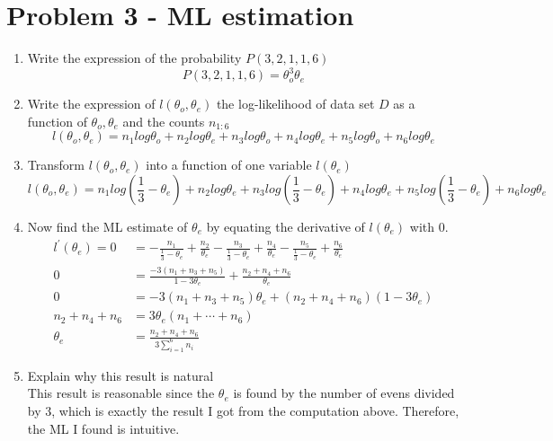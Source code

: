 \documentclass[preprint,12pt]{elsarticle}
\begin{document}
    \section{Problem 3 - ML estimation}
    \begin{enumerate}
    \item Write the expression of the probability $P(3,2,1,1,6)$
    \begin{equation*}
        P(3,2,1,1,6) = \theta_o^3\theta_e
    \end{equation*}
    
    \item Write the expression of $l(\theta_o, \theta_e)$ the log-likelihood
    of data set $D$ as a function of $\theta_o,\theta_e$ and the counts 
    $n_{1:6}$
    \begin{equation*}
        l(\theta_o, \theta_e) = n_1log\theta_o + n_2log\theta_e 
                                + n_3log\theta_o + n_4log\theta_e 
                                + n_5log\theta_o + n_6log\theta_e
    \end{equation*}

    \item Transform $l(\theta_o, \theta_e)$ into a function of one variable 
    $l(\theta_e)$
    \begin{equation*}
        l(\theta_o, \theta_e) = n_1log(\frac{1}{3} - \theta_e) + n_2log\theta_e 
                                + n_3log(\frac{1}{3} - \theta_e) + n_4log\theta_e 
                                + n_5log(\frac{1}{3} - \theta_e) + n_6log\theta_e
    \end{equation*}

    \item Now find the ML estimate of $\theta_e$ by equating the derivative of 
    $l(\theta_e)$ with $0$.
    \begin{align*}
        l^{'}(\theta_e) = 0   &= -\frac{n_1}{\frac{1}{3} - \theta_e} + \frac{n_2}{\theta_e}
                                -\frac{n_3}{\frac{1}{3} - \theta_e} + \frac{n_4}{\theta_e}
                                -\frac{n_5}{\frac{1}{3} - \theta_e} + \frac{n_6}{\theta_e} \\
                          0   &= \frac{-3(n_1+n_3+n_5)}{1 - 3\theta_e} + \frac{n_2+n_4+n_6}{\theta_e} \\
                          0   &= -3(n_1+n_3+n_5)\theta_e + (n_2+n_4+n_6)(1 - 3\theta_e) \\
                n_2+n_4+n_6   &= 3\theta_e(n_1+\cdots+n_6) \\
                    \theta_e  &= \frac{n_2+n_4+n_6}{3\sum_{i=1}^6 n_i}
    \end{align*}

    \item Explain why this result is natural \\
    This result is reasonable since the $\theta_e$ is found by the number of evens
    divided by 3, which is exactly the result I got from the computation above.
    Therefore, the ML I found is intuitive.
    \end{enumerate}
\end{document}
